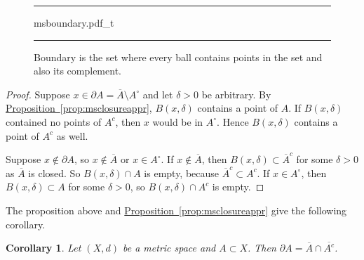 \documentclass[12pt,openany]{book}
\newcommand{\widebar}[1]{\overline{#1}}
\theoremstyle{plain}
\newtheorem{cor}[thm]{Corollary}
\theoremstyle{remark}
\theoremstyle{definition}
\newenvironment{myfig}{%
\begin{figure}[h!t]
\noindent\rule{\textwidth}{0.5pt}\vspace{12pt}\par\centering}%
{\par\noindent\rule{\textwidth}{0.5pt}
\end{figure}}
\theoremstyle{exercise}
\theoremstyle{example}
\newcommand{\propref}[1]{\hyperref[#1]{Proposition~\ref*{#1}}}
\begin{document}
\begin{myfig}
{msboundary.pdf_t}
\caption{Boundary is the set where every ball contains points in the set and
also its complement.\label{fig:msboundary}}
\end{myfig}

\begin{proof}
Suppose $x \in \partial A =  \widebar{A} \setminus A^\circ$ and
let $\delta > 0$ be arbitrary.
By \propref{prop:msclosureappr}, $B(x,\delta)$ contains
a point of $A$.  If $B(x,\delta)$ contained no points of $A^c$,
then $x$ would be in $A^\circ$.  Hence $B(x,\delta)$ contains a point of
$A^c$ as well.

Suppose $x \notin \partial A$, so $x \notin \widebar{A}$ or $x \in A^\circ$.
If $x \notin \widebar{A}$, then
$B(x,\delta) \subset \widebar{A}^c$
for some $\delta > 0$ as $\widebar{A}$ is closed.
So $B(x,\delta) \cap A$ is empty, because $\widebar{A}^c \subset
A^c$.
If $x \in A^\circ$, then
$B(x,\delta) \subset A$ for some $\delta > 0$,
so $B(x,\delta) \cap A^c$ is empty.
\end{proof}

The proposition above and \propref{prop:msclosureappr} give the following
corollary.

\begin{cor}
Let $(X,d)$ be a metric space and $A \subset X$.
Then $\partial A = \widebar{A} \cap \widebar{A^c}$.
\end{cor}
\end{document}
